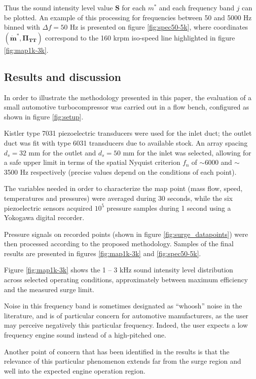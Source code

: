 Thus the sound intensity level value $\mathbf S$ for each $m^*$ and each frequency band $j$ can be plotted. An example of this processing for frequencies between 50 and 5000 Hz binned with $\Delta f = 50$ Hz is presented on figure \ref{fig:spec50-5k}, where coordinates $(\mathbf{\dot m^*},\mathbf{\Pi_\text{TT}})$ correspond to the 160 krpm iso-speed line highlighted in figure \ref{fig:map1k-3k}.

\subsection{Results and discussion}
\label{sec:results_and_discussion}

In order to illustrate the methodology presented in this paper, the evaluation of a small automotive turbocompressor was carried out in a flow bench, configured as shown in figure \ref{fig:setup}.

Kistler type 7031 piezoelectric transducers were used for the inlet duct; the outlet duct was fit with type 6031 transducers due to available stock. An array spacing $d_s=32$ mm for the outlet and $d_s=50$ mm for the inlet was selected, allowing for a safe upper limit in terms of the spatial Nyquist criterion $f_n$ of $\sim$6000 and $\sim$3500 Hz respectively (precise values depend on the conditions of each point).

The variables needed in order to characterize the map point (mass flow, speed, temperatures and pressures) were averaged during 30 seconds, while the six piezoelectric sensors acquired $10^5$ pressure samples during 1 second using a Yokogawa digital recorder.

Pressure signals on recorded points (shown in figure \ref{fig:surge_datapoints}) were then processed according to the proposed methodology. Samples of the final results are presented in figures \ref{fig:map1k-3k} and \ref{fig:spec50-5k}.

Figure \ref{fig:map1k-3k} shows the 1 -- 3 kHz sound intensity level distribution across selected operating conditions, approximately between maximum efficiency and the measured surge limit.

Noise in this frequency band is sometimes designated as ``whoosh'' noise in the literature, and is of particular concern for automotive manufacturers, as the user may perceive negatively this particular frequency. Indeed, the  user expects a low frequency engine sound instead of a high-pitched one.

Another point of concern that has been identified in the results is that the relevance of this particular phenomenon extends far from the surge region and well into the expected engine operation region.

